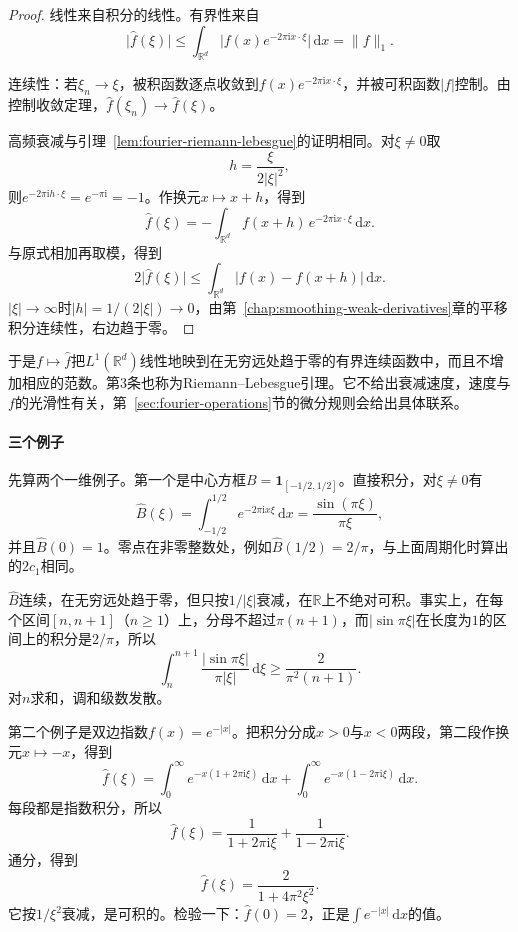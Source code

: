 \begin{proof}
线性来自积分的线性。有界性来自
\[
\lvert\widehat f(\xi)\rvert\leq\int_{\mathbb R^d}\lvert f(x)e^{-2\pi\mathrm ix\cdot\xi}\rvert\,\mathrm dx=\lVert f\rVert_1.
\]

连续性：若$\xi_n\to\xi$，被积函数逐点收敛到$f(x)e^{-2\pi\mathrm ix\cdot\xi}$，并被可积函数$\lvert f\rvert$控制。由控制收敛定理，$\widehat f(\xi_n)\to\widehat f(\xi)$。

高频衰减与引理~\ref{lem:fourier-riemann-lebesgue}的证明相同。对$\xi\neq0$取
\[
h=\frac{\xi}{2\lvert\xi\rvert^2},
\]
则$e^{-2\pi\mathrm ih\cdot\xi}=e^{-\pi\mathrm i}=-1$。作换元$x\mapsto x+h$，得到
\[
\widehat f(\xi)=-\int_{\mathbb R^d}f(x+h)\,e^{-2\pi\mathrm ix\cdot\xi}\,\mathrm dx.
\]
与原式相加再取模，得到
\[
2\lvert\widehat f(\xi)\rvert\leq\int_{\mathbb R^d}\lvert f(x)-f(x+h)\rvert\,\mathrm dx.
\]
$\lvert\xi\rvert\to\infty$时$\lvert h\rvert=1/(2\lvert\xi\rvert)\to0$，由第~\ref{chap:smoothing-weak-derivatives}章的平移积分连续性，右边趋于零。
\end{proof}

于是$f\mapsto\widehat f$把$L^1(\mathbb R^d)$线性地映到在无穷远处趋于零的有界连续函数中，而且不增加相应的范数。第3条也称为Riemann--Lebesgue引理。它不给出衰减速度，速度与$f$的光滑性有关，第~\ref{sec:fourier-operations}节的微分规则会给出具体联系。

\paragraph{三个例子}

先算两个一维例子。第一个是中心方框$B=\mathbf 1_{[-1/2,1/2]}$。直接积分，对$\xi\neq0$有
\begin{equation}
\widehat B(\xi)=\int_{-1/2}^{1/2}e^{-2\pi\mathrm ix\xi}\,\mathrm dx=\frac{\sin(\pi\xi)}{\pi\xi},
\label{eq:fourier-box}
\end{equation}
并且$\widehat B(0)=1$。零点在非零整数处，例如$\widehat B(1/2)=2/\pi$，与上面周期化时算出的$2c_1$相同。

$\widehat B$连续，在无穷远处趋于零，但只按$1/\lvert\xi\rvert$衰减，在$\mathbb R$上不绝对可积。事实上，在每个区间$[n,n+1]$（$n\geq1$）上，分母不超过$\pi(n+1)$，而$\lvert\sin\pi\xi\rvert$在长度为$1$的区间上的积分是$2/\pi$，所以
\[
\int_n^{n+1}\frac{\lvert\sin\pi\xi\rvert}{\pi\lvert\xi\rvert}\,\mathrm d\xi\geq\frac{2}{\pi^2(n+1)}.
\]
对$n$求和，调和级数发散。

第二个例子是双边指数$f(x)=e^{-\lvert x\rvert}$。把积分分成$x>0$与$x<0$两段，第二段作换元$x\mapsto-x$，得到
\[
\widehat f(\xi)=\int_0^\infty e^{-x(1+2\pi\mathrm i\xi)}\,\mathrm dx+\int_0^\infty e^{-x(1-2\pi\mathrm i\xi)}\,\mathrm dx.
\]
每段都是指数积分，所以
\[
\widehat f(\xi)=\frac1{1+2\pi\mathrm i\xi}+\frac1{1-2\pi\mathrm i\xi}.
\]
通分，得到
\begin{equation}
\widehat f(\xi)=\frac{2}{1+4\pi^2\xi^2}.
\label{eq:fourier-double-exponential}
\end{equation}
它按$1/\xi^2$衰减，是可积的。检验一下：$\widehat f(0)=2$，正是$\int e^{-\lvert x\rvert}\,\mathrm dx$的值。


